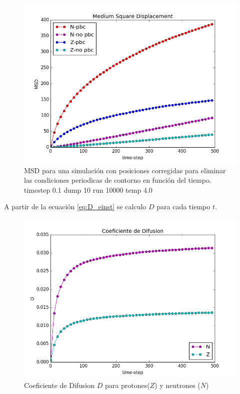 \documentclass[
 reprint,
 amsmath,amssymb,
 aps,
 a4paper
]{revtex4-1}
\begin{document}
\begin{figure}[H]
\centerline{
  \includegraphics[width=1.0\linewidth]{msd.png}}
  \caption{\small MSD para una simulación con posiciones corregidas para eliminar las condiciones periodicas de contorno en función del tiempo. timestep 0.1 dump 10 run 10000 temp 4.0}
  \label{fig:msd_t400} 
\end{figure}

A partir de la ecuación \ref{eq:D_einst} se calculo $D$ para cada tiempo $t$.

\begin{figure}[H]
\centerline{
  \includegraphics[width=1.0\linewidth]{dif.png}}
  \caption{\small Coeficiente de Difusion $D$ para protones($Z$) y neutrones ($N$)}
  \label{fig:D_t400}
\end{figure}
\end{document}

